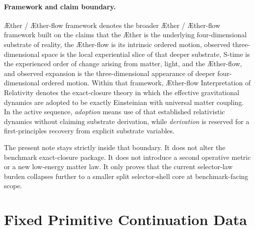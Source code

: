 \documentclass[11pt]{article}
\newcommand{\Aether}{\AE{}ther}
\newcommand{\Aflow}{\AE{}ther-flow}
\newcommand{\TheoryName}{\Aflow{} Interpretation of Relativity}
\newcommand{\TheoryProgram}{\Aether{} / \Aflow{} framework}
\begin{document}
\paragraph{Framework and claim boundary.}
\TheoryProgram{} denotes the broader \Aether{} / \Aflow{} framework built on the claims that the \Aether{} is the underlying four-dimensional substrate of reality, the \Aflow{} is its intrinsic ordered motion, observed three-dimensional space is the local experiential slice of that deeper substrate, S-time is the experienced order of change arising from matter, light, and the \Aflow{}, and observed expansion is the three-dimensional appearance of deeper four-dimensional ordered motion. Within that framework, \TheoryName{} denotes the exact-closure theory in which the effective gravitational dynamics are adopted to be exactly Einsteinian with universal matter coupling. In the active sequence, \emph{adoption} means use of that established relativistic dynamics without claiming substrate derivation, while \emph{derivation} is reserved for a first-principles recovery from explicit substrate variables.

The present note stays strictly inside that boundary. It does not alter the benchmark exact-closure package. It does not introduce a second operative metric or a new low-energy matter law. It only proves that the current selector-law burden collapses further to a smaller split selector-shell core at benchmark-facing scope.

\section{Fixed Primitive Continuation Data}
\end{document}
